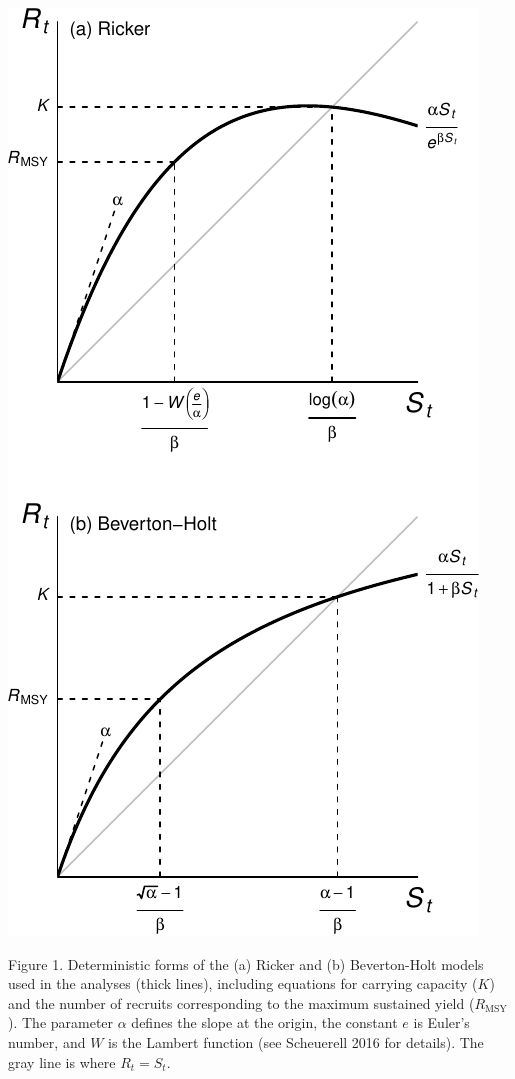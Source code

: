 \documentclass[11pt,]{article}
\begin{document}
\begin{center}\includegraphics{App_3_Summarize_results_files/figure-latex/fig_1_model_forms-1} \end{center}

Figure 1. Deterministic forms of the (a) Ricker and (b) Beverton-Holt
models used in the analyses (thick lines), including equations for
carrying capacity (\(K\)) and the number of recruits corresponding to
the maximum sustained yield (\(R_{\text{MSY}}\)). The parameter
\(\alpha\) defines the slope at the origin, the constant \(e\) is
Euler's number, and \(W\) is the Lambert function (see Scheuerell 2016
for details). The gray line is where \(R_t = S_t\).
\end{document}
